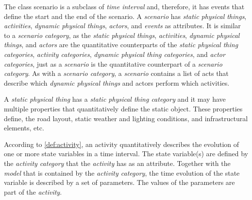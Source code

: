 \cstartb The class scenario is a subclass of \textit{time interval} and, therefore, it has events that define the start and the end of the scenario. \cendb
A \textit{scenario} has \cstartc\textit{static physical things}\cendc, \textit{activities}, \cstartb \textit{dynamic physical things}, \cendb \textit{actors}, and \textit{events} as attributes. 
It is similar to a \textit{scenario category}, as the \cstartc\textit{static physical things}\cendc, \textit{activities}, \cstartb \textit{dynamic physical things}, \cendb and \textit{actors} are the quantitative counterparts of the \cstartc\textit{static physical thing categories}\cendc, \textit{activity categories}, \cstartb \textit{dynamic physical thing categories}, \cendb and \textit{actor categories}, just as a \textit{scenario} is the quantitative counterpart of a \textit{scenario category}. 
As with a \textit{scenario category}, a \textit{scenario} contains a list of acts that describe which \cstartb \textit{dynamic physical things} and \cendb actors perform which activities.

\cstartb A \textit{static physical thing} has a \textit{static physical thing category} and it may have multiple properties that quantitatively define the static object. \cendb These properties define, the road layout, static weather and lighting conditions, and infrastructural elements, etc.

According to \cref{def:activity}, an activity quantitatively describes the evolution of one or more state variables in a time interval. The state variable(s) are defined by the \textit{activity category} that the \textit{activity} has as an attribute. Together with the \textit{model} that is contained by the \textit{activity category}, the time evolution of the state variable is described by a set of parameters. The values of the parameters are part of the \textit{activity}. 

